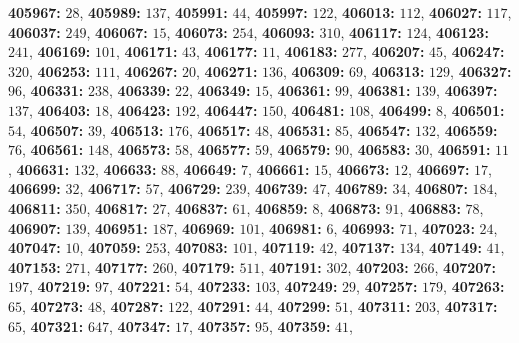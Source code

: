 \textsf{\bfseries 405967:} $28$, \textsf{\bfseries 405989:} $137$, \textsf{\bfseries 405991:} $44$, \textsf{\bfseries 405997:} $122$, \textsf{\bfseries 406013:} $112$, \textsf{\bfseries 406027:} $117$, \textsf{\bfseries 406037:} $249$, \textsf{\bfseries 406067:} $15$, \textsf{\bfseries 406073:} $254$, \textsf{\bfseries 406093:} $310$, \textsf{\bfseries 406117:} $124$, \textsf{\bfseries 406123:} $241$, \textsf{\bfseries 406169:} $101$, \textsf{\bfseries 406171:} $43$, \textsf{\bfseries 406177:} $11$, \textsf{\bfseries 406183:} $277$, \textsf{\bfseries 406207:} $45$, \textsf{\bfseries 406247:} $320$, \textsf{\bfseries 406253:} $111$, \textsf{\bfseries 406267:} $20$, \textsf{\bfseries 406271:} $136$, \textsf{\bfseries 406309:} $69$, \textsf{\bfseries 406313:} $129$, \textsf{\bfseries 406327:} $96$, \textsf{\bfseries 406331:} $238$, \textsf{\bfseries 406339:} $22$, \textsf{\bfseries 406349:} $15$, \textsf{\bfseries 406361:} $99$, \textsf{\bfseries 406381:} $139$, \textsf{\bfseries 406397:} $137$, \textsf{\bfseries 406403:} $18$, \textsf{\bfseries 406423:} $192$, \textsf{\bfseries 406447:} $150$, \textsf{\bfseries 406481:} $108$, \textsf{\bfseries 406499:} $8$, \textsf{\bfseries 406501:} $54$, \textsf{\bfseries 406507:} $39$, \textsf{\bfseries 406513:} $176$, \textsf{\bfseries 406517:} $48$, \textsf{\bfseries 406531:} $85$, \textsf{\bfseries 406547:} $132$, \textsf{\bfseries 406559:} $76$, \textsf{\bfseries 406561:} $148$, \textsf{\bfseries 406573:} $58$, \textsf{\bfseries 406577:} $59$, \textsf{\bfseries 406579:} $90$, \textsf{\bfseries 406583:} $30$, \textsf{\bfseries 406591:} $11$, \textsf{\bfseries 406631:} $132$, \textsf{\bfseries 406633:} $88$, \textsf{\bfseries 406649:} $7$, \textsf{\bfseries 406661:} $15$, \textsf{\bfseries 406673:} $12$, \textsf{\bfseries 406697:} $17$, \textsf{\bfseries 406699:} $32$, \textsf{\bfseries 406717:} $57$, \textsf{\bfseries 406729:} $239$, \textsf{\bfseries 406739:} $47$, \textsf{\bfseries 406789:} $34$, \textsf{\bfseries 406807:} $184$, \textsf{\bfseries 406811:} $350$, \textsf{\bfseries 406817:} $27$, \textsf{\bfseries 406837:} $61$, \textsf{\bfseries 406859:} $8$, \textsf{\bfseries 406873:} $91$, \textsf{\bfseries 406883:} $78$, \textsf{\bfseries 406907:} $139$, \textsf{\bfseries 406951:} $187$, \textsf{\bfseries 406969:} $101$, \textsf{\bfseries 406981:} $6$, \textsf{\bfseries 406993:} $71$, \textsf{\bfseries 407023:} $24$, \textsf{\bfseries 407047:} $10$, \textsf{\bfseries 407059:} $253$, \textsf{\bfseries 407083:} $101$, \textsf{\bfseries 407119:} $42$, \textsf{\bfseries 407137:} $134$, \textsf{\bfseries 407149:} $41$, \textsf{\bfseries 407153:} $271$, \textsf{\bfseries 407177:} $260$, \textsf{\bfseries 407179:} $511$, \textsf{\bfseries 407191:} $302$, \textsf{\bfseries 407203:} $266$, \textsf{\bfseries 407207:} $197$, \textsf{\bfseries 407219:} $97$, \textsf{\bfseries 407221:} $54$, \textsf{\bfseries 407233:} $103$, \textsf{\bfseries 407249:} $29$, \textsf{\bfseries 407257:} $179$, \textsf{\bfseries 407263:} $65$, \textsf{\bfseries 407273:} $48$, \textsf{\bfseries 407287:} $122$, \textsf{\bfseries 407291:} $44$, \textsf{\bfseries 407299:} $51$, \textsf{\bfseries 407311:} $203$, \textsf{\bfseries 407317:} $65$, \textsf{\bfseries 407321:} $647$, \textsf{\bfseries 407347:} $17$, \textsf{\bfseries 407357:} $95$, \textsf{\bfseries 407359:} $41$, 
